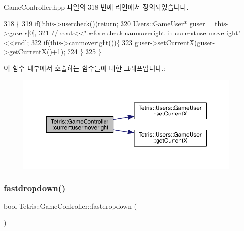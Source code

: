 Game\+Controller.\+hpp 파일의 318 번째 라인에서 정의되었습니다.


\begin{DoxyCode}
318                                        \{
319                 \textcolor{keywordflow}{if}(!this->\hyperlink{class_tetris_1_1_game_controller_ab96e22daad51119b35cbee8cfb7385ef}{usercheck}())\textcolor{keywordflow}{return};
320                 \hyperlink{class_tetris_1_1_users_1_1_game_user}{Users::GameUser}* guser = this->\hyperlink{class_tetris_1_1_game_controller_a1a31d3a933daad6d95e20458eea2900e}{gusers}[0];
321                \textcolor{comment}{// cout<<"before check canmoveright in currentusermoveright"<<endl;}
322                 \textcolor{keywordflow}{if}(this->\hyperlink{class_tetris_1_1_game_controller_a6c8189bb893502049396a7de1a73a88c}{canmoveright}())\{
323                     guser->\hyperlink{class_tetris_1_1_users_1_1_game_user_a2957358b1a6298f06c6c2e10cb89f623}{setCurrentX}(guser->\hyperlink{class_tetris_1_1_users_1_1_game_user_ad25eace96bd27ae6df4a0c0d506be730}{getCurrentX}()+1);
324                 \}
325             \}
\end{DoxyCode}
이 함수 내부에서 호출하는 함수들에 대한 그래프입니다.\+:
\nopagebreak
\begin{figure}[H]
\begin{center}
\leavevmode
\includegraphics[width=350pt]{db/dd2/class_tetris_1_1_game_controller_a1d2859507cbc9bf9789753228cdedc1f_cgraph}
\end{center}
\end{figure}
\mbox{\label{class_tetris_1_1_game_controller_a8d5b65ec7638519a39b4ba8a71e67fff}} 
\subsubsection{\texorpdfstring{fastdropdown()}{fastdropdown()}\hspace{0.1cm}{\footnotesize\ttfamily [1/2]}}
{\footnotesize\ttfamily bool Tetris\+::\+Game\+Controller\+::fastdropdown (\begin{DoxyParamCaption}{ }\end{DoxyParamCaption})}



